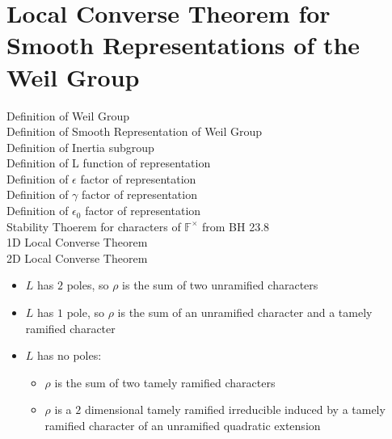 \chapter{Local Converse Theorem for Smooth Representations of the Weil Group}	%
Definition of Weil Group \\
Definition of Smooth Representation of Weil Group \\
Definition of Inertia subgroup \\
Definition of L function of representation \\
Definition of $\epsilon$ factor of representation \\
Definition of $\gamma$ factor of representation \\
Definition of $\epsilon_0$ factor of representation \\
Stability Thoerem for characters of $\mathbb{F}^\times$ from BH 23.8\\
1D Local Converse Theorem \\
2D Local Converse Theorem \\
\begin{itemize}
\item $L$ has $2$ poles, so $\rho$ is the sum of two unramified characters
\item $L$ has $1$ pole, so $\rho$ is the sum of an unramified character and a tamely ramified character
\item $L$ has no poles:
\begin{itemize}
\item $\rho$ is the sum of two tamely ramified characters
\item $\rho$ is a $2$ dimensional tamely ramified irreducible induced by a tamely ramified character of an unramified quadratic extension
\end{itemize}
\end{itemize}
\endinput